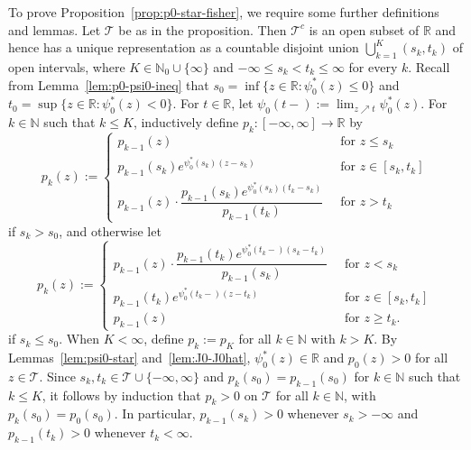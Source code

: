 \documentclass[a4paper]{article}
\newcommand{\N}{\mathbb{N}}
\newcommand{\R}{\mathbb{R}}
\theoremstyle{definition}
\begin{document}
To prove Proposition~\ref{prop:p0-star-fisher}, we require some further definitions and lemmas. Let $\mathcal{T}$ be as in the proposition. Then $\mathcal{T}^c$ is an open subset of $\mathbb{R}$ and hence has a unique representation as a countable disjoint union $\bigcup_{k=1}^K (s_k,t_k)$ of open intervals, where $K \in \N_0 \cup \{\infty\}$ and $-\infty \leq s_k < t_k \leq \infty$ for every $k$. Recall from Lemma~\ref{lem:p0-psi0-ineq} that $s_0 = \inf\{z \in \R : \psi_0^*(z) \leq 0\}$ and $t_0 = \sup\{z \in \R : \psi_0^*(z) < 0\}$. For $t \in \R$, let $\psi_0(t-) := \lim_{z \nearrow t}\psi_0^*(z)$. For $k \in \N$ such that $k \leq K$, inductively define $p_k \colon [-\infty,\infty] \to \R$ by
\[
p_k(z) := 
\begin{cases}
p_{k-1}(z) \;\;&\text{for }z \leq s_k \\
p_{k-1}(s_k)e^{\psi_0^*(s_k)(z - s_k)} \;\;&\text{for } z \in [s_k,t_k] \\
p_{k-1}(z) \cdot \dfrac{p_{k-1}(s_k)e^{\psi_0^*(s_k)(t_k - s_k)}}{p_{k-1}(t_k)} \;\;&\text{for }z > t_k
\end{cases}
\]
if $s_k > s_0$, and otherwise let 
\[
p_k(z) := 
\begin{cases}
p_{k-1}(z) \cdot \dfrac{p_{k-1}(t_k)e^{\psi_0^*(t_k-)(s_k - t_k)}}{p_{k-1}(s_k)}  \;\;&\text{for }z < s_k \\[6pt]
p_{k-1}(t_k)e^{\psi_0^*(t_k-)(z - t_k)} \;\;&\text{for } z \in [s_k,t_k] \\
p_{k-1}(z) \;\;&\text{for }z \geq t_k.
\end{cases}
\]
if $s_k \leq s_0$. When $K < \infty$, define $p_k := p_K$ for all $k \in \N$ with $k > K$. By Lemmas~\ref{lem:psi0-star} and~\ref{lem:J0-J0hat}, $\psi_0^*(z) \in \R$ and $p_0(z) > 0$ for all $z \in \mathcal{T}$. Since $s_k,t_k \in \mathcal{T} \cup \{-\infty,\infty\}$ and $p_k(s_0) = p_{k-1}(s_0)$ for $k \in \N$ such that $k \leq K$, it follows by induction that $p_k > 0$ on $\mathcal{T}$ for all $k \in \N$, with $p_k(s_0) = p_0(s_0)$. In particular, $p_{k-1}(s_k) > 0$ whenever $s_k > -\infty$ and $p_{k-1}(t_k) > 0$ whenever $t_k < \infty$.
\end{document}
